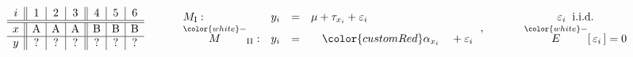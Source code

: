 
\begin{minipage}{4in}
{\tiny
\begin{equation*}
\begin{array}{c||c|c|c||c|c|c}
i & 1 & 2 & 3 & 4 & 5 & 6 \\
\hline\hline
x & \textnormal{A} & \textnormal{A} & \textnormal{A} &
      \textnormal{B} & \textnormal{B} & \textnormal{B}
\\
\hline
y & ? & ? & ? & ? & ? & ?
\end{array}
\quad
\quad
\quad
\begin{array}{lccl}
	M_{\textnormal{I}}: & y_{i} &=& \mu + \tau_{x_{i}} + \varepsilon_{i}
	\\
	\overset{{\color{white}-}}{M}_{\textnormal{II}}: & y_{i} &=& \mbox{}\quad{\color{customRed}\alpha_{x_{i}}}\quad\mbox{} + \varepsilon_{i}
\end{array}\,,
\quad
\quad
\quad
\begin{array}{c}
	\varepsilon_{i} \;\; \textnormal{i.i.d.}
	\\
	\overset{{\color{white}-}}{E}\!\left[\,\varepsilon_{i}\,\right] = 0
\end{array}
\end{equation*}
}

\vskip -0.7cm


\end{minipage}
